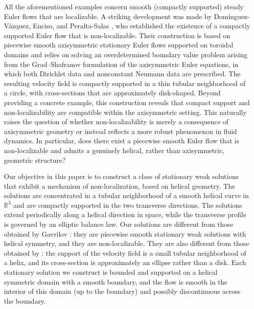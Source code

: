 \documentclass[12pt,reqno]{amsart}
\numberwithin{equation}{section}
\theoremstyle{definition}
\theoremstyle{remark}
\begin{document}
All the aforementioned examples concern smooth (compactly supported) steady Euler flows that are localizable. A striking development was made by Dom\'inguez-V\'azquez, Enciso, and Peralta-Salas \cite{DominguezVazquezEncisoPeraltaSalas2021}, who established the existence of a compactly supported Euler flow that is non-localizable. Their construction is based on piecewise smooth axisymmetric stationary Euler flows supported on toroidal domains and relies on solving an overdetermined boundary value problem arising from the Grad--Shafranov formulation of the axisymmetric Euler equations, in which both Dirichlet data and nonconstant Neumann data are prescribed. The resulting velocity field is compactly supported in a thin tubular neighborhood of a circle, with cross-sections that are approximately disk-shaped. 
Beyond providing a concrete example, this construction reveals that compact support and non-localizability are compatible within the axisymmetric setting. This naturally raises the question of whether non-localizability is merely a consequence of axisymmetric geometry or instead reflects a more robust phenomenon in fluid dynamics. In particular, does there exist a piecewise smooth Euler flow that is non-localizable and admits a genuinely helical, rather than axisymmetric, geometric structure?

Our objective in this paper is to construct a class of stationary weak solutions that exhibit a     mechanism of non-localization, 
  based on helical geometry. The solutions are concentrated in a tubular neighborhood of a smooth
helical curve in $ \mathbb{R}^3 $ and are compactly supported in the two transverse directions. %
The solutions extend periodically along a helical direction
in space, while the transverse profile is governed by an elliptic balance law. Our solutions are   different from those obtained by Gavrilov \cite{GavrilovHelical}: they
are piecewise smooth stationary weak solutions with helical symmetry, and they are
non-localizable.  They  are also  different from those obtained by \cite{DominguezVazquezEncisoPeraltaSalas2021}: the support of the velocity field is  a small tubular neighborhood of a helix, and its cross-section is
approximately an ellipse rather than a disk.  Each stationary solution we construct is bounded  and supported on a helical symmetric  domain with a smooth boundary, and the flow is smooth in the interior of this domain (up to the boundary) and possibly discontinuous
across the boundary. 
\end{document}
